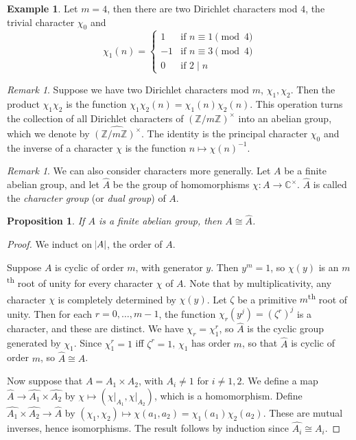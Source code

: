 \documentclass[11pt]{article}
\theoremstyle{definition}
\newtheorem{example}[definition]{Example}
\theoremstyle{plain}
\newtheorem{proposition}[definition]{Proposition}
\theoremstyle{remark}
\newtheorem{remark}[definition]{Remark}
\newcommand{\ZZ}{\mathbb{Z}}
\newcommand{\CC}{\mathbb{C}}
\begin{document}
\begin{example}\label{eg:7_9}
    Let $m=4$, then there are two Dirichlet characters mod $4$, the trivial character $\chi_0$ and
    \begin{equation*}
        \chi_1(n) =
        \begin{cases}
            1 & \text{if } n \equiv 1 \pmod{4}\\
            -1 & \text{if } n \equiv 3 \pmod{4}\\
            0 & \text{if } 2 \mid n
        \end{cases}
    \end{equation*}
\end{example}

\begin{remark}\label{rem:7_9}
    Suppose we have two Dirichlet characters mod $m$, $\chi_1, \chi_2$. Then the product $\chi_1 \chi_2$ is the function $\chi_1 \chi_2(n) = \chi_1(n) \chi_2(n)$. This operation turns the collection of all Dirichlet characters of $(\ZZ/m\ZZ)^\times$ into an abelian group, which we denote by $\widehat{(\ZZ/m\ZZ)^\times}$. The identity is the principal character $\chi_0$ and the inverse of a character $\chi$ is the function $n \mapsto \chi(n)^{-1}$.
\end{remark}

\begin{remark}\label{rem:7_10}
    We can also consider characters more generally. Let $A$ be a finite abelian group, and let $\widehat{A}$ be the group of homomorphisms $\chi : A \to \CC^\times$. $\widehat{A}$ is called the \emph{character group} (or \emph{dual group}) of $A$.
\end{remark}

\begin{proposition}\label{prop:7_11}
    If $A$ is a finite abelian group, then $A \cong \widehat{A}$.
\end{proposition}
\begin{proof}
    We induct on $\abs{A}$, the order of $A$.

    Suppose $A$ is cyclic of order $m$, with generator $y$. Then $y^m = 1$, so $\chi(y)$ is an $m$\textsuperscript{th} root of unity for every character $\chi$ of $A$. Note that by multiplicativity, any character $\chi$ is completely determined by $\chi(y)$. Let $\zeta$ be a primitive $m$\textsuperscript{th} root of unity. Then for each $r=0,\ldots,m-1$, the function $\chi_r(y^j) = (\zeta^r)^j$ is a character, and these are distinct. We have $\chi_r = \chi_1^r$, so $\widehat{A}$ is the cyclic group generated by $\chi_1$. Since $\chi_1^r = 1$ iff $\zeta^r = 1$, $\chi_1$ has order $m$, so that $\widehat{A}$ is cyclic of order $m$, so $\widehat{A} \cong A$.

    Now suppose that $A = A_1 \times A_2$, with $A_i \neq 1$ for $i \neq 1, 2$. We define a map $\widehat{A} \to \widehat{A_1} \times \widehat{A_2}$ by $\chi \mapsto (\chi \vert_{A_1}, \chi \vert_{A_2})$, which is a homomorphism. Define $\widehat{A_1} \times \widehat{A_2} \to \widehat{A}$ by $(\chi_1, \chi_2) \mapsto \chi(a_1, a_2) = \chi_1(a_1) \chi_2(a_2)$. These are mutual inverses, hence isomorphisms. The result follows by induction since $\widehat{A_i} \cong A_i$.
\end{proof}
\end{document}
